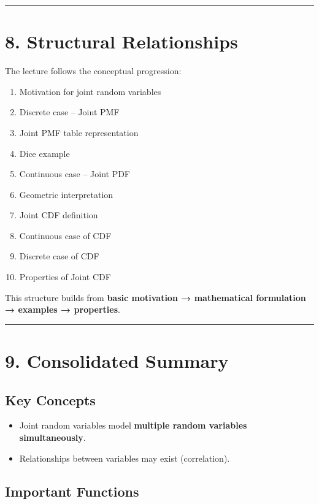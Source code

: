 \documentclass[12pt]{article}
\begin{document}
\hrule
\vspace{0.5cm}

\section*{8. Structural Relationships}

The lecture follows the conceptual progression:

\begin{enumerate}
\item Motivation for joint random variables
\item Discrete case – Joint PMF
\item Joint PMF table representation
\item Dice example
\item Continuous case – Joint PDF
\item Geometric interpretation
\item Joint CDF definition
\item Continuous case of CDF
\item Discrete case of CDF
\item Properties of Joint CDF
\end{enumerate}

This structure builds from \textbf{basic motivation → mathematical formulation → examples → properties}.

\hrule
\vspace{0.5cm}

\newpage
\section*{9. Consolidated Summary}

\subsection*{Key Concepts}

\begin{itemize}
\item Joint random variables model \textbf{multiple random variables simultaneously}.
\item Relationships between variables may exist (correlation).
\end{itemize}

\subsection*{Important Functions}
\end{document}
